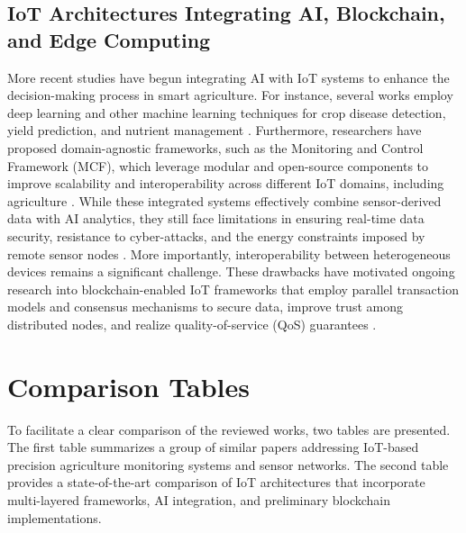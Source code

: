 \documentclass[12pt,onecolumn]{IEEEtran} %
\begin{document}
\subsection{IoT Architectures Integrating AI, Blockchain, and Edge Computing}
More recent studies have begun integrating AI with IoT systems to enhance the decision-making process in smart agriculture. For instance, several works employ deep learning and other machine learning techniques for crop disease detection, yield prediction, and nutrient management \cite{raju2022aselfpoweredrealtime, bakthavatchalam2022iotframeworkfor}. Furthermore, researchers have proposed domain-agnostic frameworks, such as the Monitoring and Control Framework (MCF), which leverage modular and open-source components to improve scalability and interoperability across different IoT domains, including agriculture \cite{senoo2023monitoringandcontrol, senoo2023monitoringandcontrol}. While these integrated systems effectively combine sensor-derived data with AI analytics, they still face limitations in ensuring real-time data security, resistance to cyber-attacks, and the energy constraints imposed by remote sensor nodes \cite{abunadi2022trafficawaresecuredcooperative, ouafiq2022datamanagementand}. More importantly, interoperability between heterogeneous devices remains a significant challenge. These drawbacks have motivated ongoing research into blockchain-enabled IoT frameworks that employ parallel transaction models and consensus mechanisms to secure data, improve trust among distributed nodes, and realize quality-of-service (QoS) guarantees \cite{quy2022iotenabledsmartagriculture, abunadi2022trafficawaresecuredcooperative}.

\section{Comparison Tables}
To facilitate a clear comparison of the reviewed works, two tables are presented. The first table summarizes a group of similar papers addressing IoT-based precision agriculture monitoring systems and sensor networks. The second table provides a state-of-the-art comparison of IoT architectures that incorporate multi-layered frameworks, AI integration, and preliminary blockchain implementations.
\end{document}
